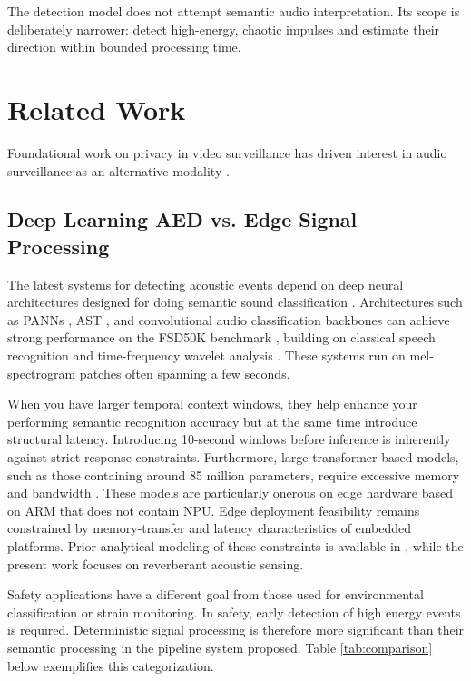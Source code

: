 \documentclass[conference]{IEEEtran}
\begin{document}
The detection model does not attempt semantic audio interpretation. Its scope is deliberately narrower: detect high-energy, chaotic impulses and estimate their direction within bounded processing time.

\section{Related Work}

Foundational work on privacy in video surveillance \cite{b1} has driven interest in audio surveillance \cite{b2} as an alternative modality \cite{b4}.

\subsection{Deep Learning AED vs. Edge Signal Processing}

The latest systems for detecting acoustic events depend on deep neural architectures designed for doing semantic sound classification \cite{b8, b12}. Architectures such as PANNs \cite{b22}, AST \cite{b23}, and convolutional audio classification backbones \cite{b35} can achieve strong performance on the FSD50K benchmark \cite{b19}, building on classical speech recognition \cite{b11} and time-frequency wavelet analysis \cite{b10}. These systems run on mel-spectrogram patches often spanning a few seconds.

When you have larger temporal context windows, they help enhance your performing semantic recognition accuracy but at the same time introduce structural latency. Introducing 10-second windows before inference is inherently against strict response constraints. Furthermore, large transformer-based models, such as those containing around 85 million parameters, require excessive memory and bandwidth \cite{b15, b16}. These models are particularly onerous on edge hardware based on ARM that does not contain NPU. Edge deployment feasibility remains constrained by memory-transfer and latency characteristics of embedded platforms. Prior analytical modeling of these constraints is available in \cite{b34}, while the present work focuses on reverberant acoustic sensing.

Safety applications have a different goal from those used for environmental classification or strain monitoring. In safety, early detection of high energy events is required. Deterministic signal processing is therefore more significant than their semantic processing in the pipeline system proposed. Table \ref{tab:comparison} below exemplifies this categorization.
\end{document}
